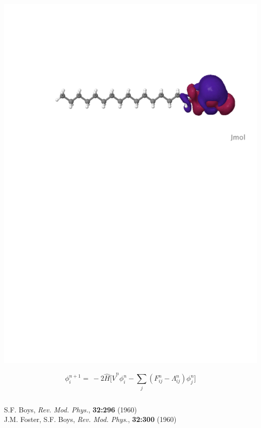 \documentclass[mathserif, 10pt]{beamer}
\begin{document}
\begin{frame}
\begin{columns}
\begin{column}[b]{0.48\linewidth}
{    \includegraphics[scale=0.25, clip, viewport = 80 560 600 700]{figures/loc_orb_3.pdf}\\

    \vspace{2mm}

    \begin{equation}
        \nonumber
        \phi_i^{n+1} =\ -2\hat{H}\Bigg[\hat{V}^n\phi_i^n
        - \sum_j(F^n_{ij} - \Lambda^n_{ij})\phi_j^n\Bigg]
    \end{equation}
}
    \end{column}
    \end{columns}

    \vspace{6mm}

    \centering
    \tiny
    S.F. Boys,
    {\it Rev. Mod. Phys.}, 
    \textbf{32:296}
    (1960)\\
    J.M. Foster, S.F. Boys,
    {\it Rev. Mod. Phys.}, 
    \textbf{32:300}
    (1960)
\end{frame}
\end{document}

